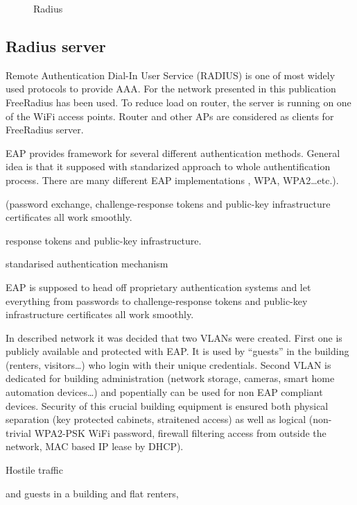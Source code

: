 \documentclass{llncs}
\begin{document}
\begin{figure}
	\vspace{-15pt}
	\caption{Radius}
\end{figure}

\subsection{Radius server}


Remote Authentication Dial-In User Service (RADIUS) \cite{rfc2865} is one of
most widely used protocols to provide AAA. For the network presented in this
publication FreeRadius \cite{freeRadius} has been used. To reduce load on
router, the server is running on one of the WiFi access points. Router and other
APs are considered as clients for FreeRadius server. 


EAP provides framework for several different authentication methods. General
idea is that it supposed  with standarized
approach to whole authentification process. There are many different EAP
implementations , WPA, WPA2\ldots etc.).


 (password exchange,
challenge-response tokens and public-key infrastructure certificates all work smoothly.

 response tokens and public-key infrastructure.


standarised authentication mechanism

 EAP is supposed to head off
proprietary authentication systems and let everything from passwords to challenge-response tokens and public-key
infrastructure certificates all work smoothly.

In described network it was decided that two VLANs were created. First one is
publicly available and protected with EAP. It is used by ``guests'' in the building
(renters, visitors\ldots) who login with their unique credentials. Second VLAN
is dedicated for building administration (network storage, cameras, smart home
automation devices\ldots) and popentially can be used for non EAP compliant
devices. Security of this crucial building equipment is ensured both physical
separation (key protected cabinets, straitened access) as well as logical
(non-trivial WPA2-PSK WiFi password, firewall filtering access from outside the
network, MAC based IP lease by DHCP). 

Hostile traffic

and guests in a building and
flat renters,
\end{document}
